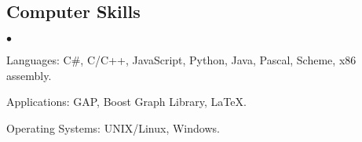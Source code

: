 \documentclass[margin,line]{res}
\newenvironment{list2}{
  \begin{list}{$\bullet$}{%
      \setlength{\itemsep}{0in}
      \setlength{\parsep}{0in} \setlength{\parskip}{0in}
      \setlength{\topsep}{0in} \setlength{\partopsep}{0in} 
      \setlength{\leftmargin}{0.2in}}}{\end{list}}
\begin{document}
\begin{resume}
\section{\sc Computer Skills} 
\begin{list2}
\item Languages: C\#, C/C++, JavaScript, Python, Java, Pascal, Scheme, x86 assembly.
\item Applications: GAP, Boost Graph Library, \LaTeX.
\item Operating Systems:  UNIX/Linux, Windows.
\end{list2}

\end{resume}
\end{document}
